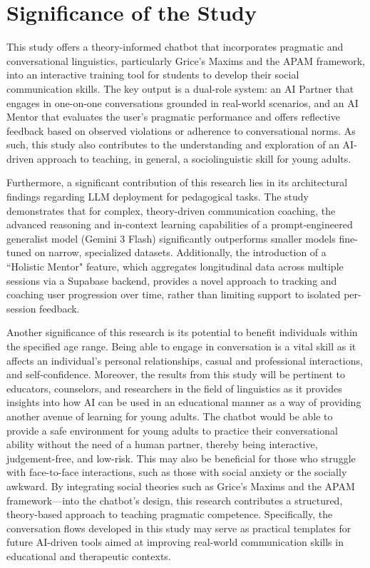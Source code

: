 \section{Significance of the Study}

\indent This study offers a theory-informed chatbot that incorporates pragmatic and conversational linguistics, particularly Grice's Maxims and the APAM framework, 
into an interactive training tool for students to develop their social communication skills. 
The key output is a dual-role system: an AI Partner that engages in one-on-one conversations grounded in real-world scenarios, and an AI Mentor that evaluates the user's 
pragmatic performance and offers reflective feedback based on observed violations or adherence to conversational norms. As such, this study also contributes to the 
understanding and exploration of an AI-driven approach to teaching, in general, a sociolinguistic skill for young adults. 

Furthermore, a significant contribution of this research lies in its architectural findings regarding LLM deployment for pedagogical tasks. 
The study demonstrates that for complex, theory-driven communication coaching, the advanced reasoning and in-context learning capabilities of a prompt-engineered 
generalist model (Gemini 3 Flash) significantly outperforms smaller models fine-tuned on narrow, specialized datasets. Additionally, the introduction of a 
``Holistic Mentor" feature, which aggregates longitudinal data across multiple sessions via a Supabase backend, provides a novel approach to tracking and coaching 
user progression over time, rather than limiting support to isolated per-session feedback.

Another significance of this research is its potential to benefit individuals within the specified age range. Being able to engage in conversation is a vital skill as it 
affects an individual's personal relationships, casual and professional interactions, and self-confidence. Moreover, the results from this study will be pertinent to educators, 
counselors, and researchers in the field of linguistics as it provides insights into how AI can be used in an educational manner as a way of providing another avenue of 
learning for young adults. The chatbot would be able to provide a safe environment for young adults to practice their conversational ability without the need of a human 
partner, thereby being interactive, judgement-free, and low-risk. This may also be beneficial for those who struggle with face-to-face interactions, such as those with social anxiety or the 
socially awkward. By integrating social theories such as Grice’s Maxims and the APAM framework—into the chatbot’s design, this research contributes a structured, theory-based 
approach to teaching pragmatic competence. Specifically, the conversation flows developed in this study may serve as practical templates for future AI-driven tools aimed at 
improving real-world communication skills in educational and therapeutic contexts.

